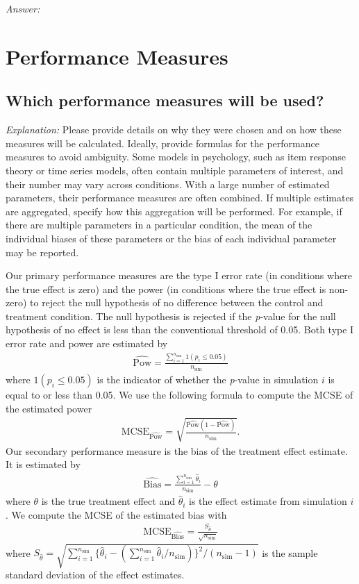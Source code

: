 \documentclass[12pt]{article}
\begin{document}
\textit{Answer:}

\section{Performance Measures}
\subsection{Which performance measures will be used?}

\textit{Explanation:} Please provide details on why they were chosen and on how these measures will be calculated. Ideally, provide formulas for the performance measures to avoid ambiguity. Some models in psychology, such as item response theory or time series models, often contain multiple parameters of interest, and their number may vary across conditions. With a large number of estimated parameters, their performance measures are often combined. If multiple estimates are aggregated, specify how this aggregation will be performed. For example, if there are multiple parameters in a particular condition, the mean of the individual biases of these parameters or the bias of each individual parameter may be reported.

\begin{examplebox}
Our primary performance measures are the type I error rate (in conditions where the true effect is zero) and the power (in conditions where the true effect is non-zero) to reject the null hypothesis of no difference between the control and treatment condition. The null hypothesis is rejected if the \textit{p}-value for the null hypothesis of no effect is less than the conventional threshold of 0.05. Both type I error rate and power are estimated by
\begin{align*}
   \widehat{\text{Pow}} = \frac{\sum_{i=1}^{n_{\text{sim}}} 1(p_i \leq 0.05)}{n_{\text{sim}}}
\end{align*}
where $1(p_i \leq 0.05)$ is the indicator of whether the \textit{p}-value in simulation $i$ is equal to or less than 0.05. We use the following formula to compute the MCSE of the estimated power
\begin{align*}
    \text{MCSE}_{\widehat{\text{Pow}}} = \sqrt{\frac{\widehat{\text{Pow}} (1 - \widehat{\text{Pow}})}{n_{\text{sim}}}}.
\end{align*}
Our secondary performance measure is the bias of the treatment effect estimate. It is estimated by
\begin{align*}
   \widehat{\text{Bias}} = \frac{\sum_{i=1}^{n_{\text{sim}}} \hat{\theta}_i}{n_{\text{sim}}} - \theta
\end{align*}
where $\theta$ is the true treatment effect and $\hat{\theta}_i$ is the effect estimate from simulation $i$. We compute the MCSE of the estimated bias with
\begin{align*}
    \text{MCSE}_{\widehat{\text{Bias}}} = \frac{S_{\hat{\theta}}}{\sqrt{n_{\text{sim}}}}
\end{align*}
where $S_{\hat{\theta}} = \sqrt{\sum_{i=1}^{n_{\text{sim}}}{ \{\hat{\theta}_i - (\sum_{i=1}^{n_{\text{sim}}}\hat{\theta}_i/n_{\text{sim}})\}^2}/(n_{\text{sim}} - 1)}$ is the sample standard deviation of the effect estimates.
\end{examplebox}
\end{document}
